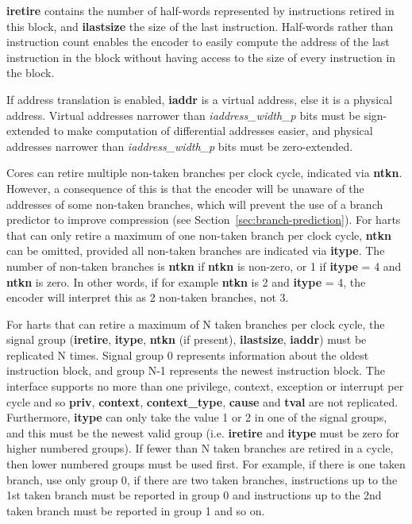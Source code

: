 \textbf{iretire} contains the number of half-words represented by
instructions retired in this block, and \textbf{ilastsize} the size of the last
instruction.  Half-words rather than instruction count enables the encoder to easily compute the address of
the last instruction in the block without having access to the size of every 
instruction in the block.  

If address translation is enabled, \textbf{iaddr} is a virtual
address, else it is a physical address. Virtual addresses narrower
than \textit{iaddress\_width\_p} bits must be sign-extended to make
computation of differential addresses easier, and physical addresses
narrower than \textit{iaddress\_width\_p} bits must be zero-extended.

Cores can retire multiple non-taken branches per clock cycle, indicated via \textbf{ntkn}.
However, a consequence of this is that the encoder will be unaware of the addresses of some non-taken branches, 
which will prevent the use of a branch predictor to improve compression (see Section~\ref{sec:branch-prediction}).
For harts that can only retire a maximum of one non-taken branch per clock cycle,
\textbf{ntkn} can be omitted, provided all non-taken branches are indicated via \textbf{itype}.  
The number of non-taken branches is \textbf{ntkn} if \textbf{ntkn} is non-zero, or 1 if \textbf{itype} = 4 and \textbf{ntkn} is zero.
In other words, if for example \textbf{ntkn} is 2 and \textbf{itype} = 4, the encoder will interpret this as 2 non-taken branches,
not 3.

For harts that can retire a maximum of N taken branches per clock
cycle, the signal group (\textbf{iretire}, \textbf{itype},
\textbf{ntkn} (if present), \textbf{ilastsize}, \textbf{iaddr}) must be replicated N times. Signal group 0
represents information about the oldest instruction block, and group N-1
represents the newest instruction block. The interface supports no more
than one privilege, context, exception or interrupt per cycle and so \textbf{priv}, 
\textbf{context}, \textbf{context\_type}, \textbf{cause} and
\textbf{tval} are not replicated. Furthermore, \textbf{itype} can only
take the value 1 or 2 in one of the signal groups, and this must be
the newest valid group (i.e. \textbf{iretire} and \textbf{itype} must
be zero for higher numbered groups). If fewer than N taken branches
are retired in a cycle, then lower numbered groups must be used
first. For example, if there is one taken branch, use only group 0, if
there are two taken branches, instructions up to the 1st taken branch
must be reported in group 0 and instructions up to the 2nd taken branch
must be reported in group 1 and so on.


